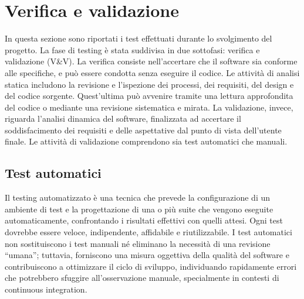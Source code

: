 \chapter{Verifica e validazione}
\label{cap:verifica-validazione}

\par In questa sezione sono riportati i test effettuati durante lo svolgimento del progetto. La fase di testing è stata suddivisa in due sottofasi: verifica e validazione (V\&V). La verifica consiste nell’accertare che il software sia conforme alle specifiche, e può essere condotta senza eseguire il codice. Le attività di analisi statica includono la revisione e l’ispezione dei processi, dei \gls{requisiti}, del design e del codice sorgente. Quest’ultima può avvenire tramite una lettura approfondita del codice o mediante una revisione sistematica e mirata. La validazione, invece, riguarda l’analisi dinamica del software, finalizzata ad accertare il soddisfacimento dei \gls{requisiti} e delle aspettative dal punto di vista dell’utente finale. Le attività di validazione comprendono sia test automatici che manuali.


\section{Test automatici}

\par Il testing automatizzato è una tecnica che prevede la configurazione di un ambiente di test e la progettazione di una o più suite che vengono eseguite automaticamente, confrontando i risultati effettivi con quelli attesi. Ogni test dovrebbe essere veloce, indipendente, affidabile e riutilizzabile. I test automatici non sostituiscono i test manuali né eliminano la necessità di una revisione “umana”; tuttavia, forniscono una misura oggettiva della qualità del software e contribuiscono a ottimizzare il ciclo di sviluppo, individuando rapidamente errori che potrebbero sfuggire all’osservazione manuale, specialmente in contesti di \gls{continuous integration}.

